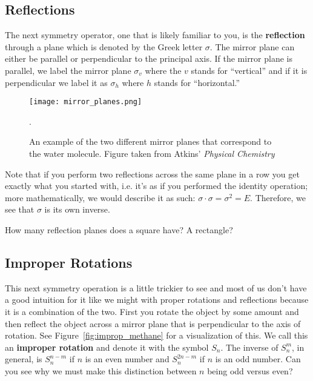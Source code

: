 
        \subsection*{Reflections} %
        \label{sub:reflection}

        The next symmetry operator, one that is likely familiar to you, is the \textbf{reflection} through a plane which is denoted by the Greek letter $\sigma.$ The mirror plane can either be parallel or perpendicular to the principal axis. If the mirror plane is parallel, we label the mirror plane $\sigma_v$ where the $v$ stands for ``vertical'' and if it is perpendicular we label it as $\sigma_h$ where $h$ stands for ``horizontal.''

        \begin{figure}[ht]
            \centering
            \texttt{[image: mirror\_planes.png]}
            \caption{An example of the two different mirror planes that correspond to the water molecule. Figure taken from Atkins' \emph{Physical Chemistry} \citep{atkins2014physical}}.
            \label{fig:mirros}
        \end{figure}

        Note that if you perform two reflections across the same plane in a row you get exactly what you started with, i.e. it's as if you performed the identity operation; more mathematically, we would describe it as such: $\sigma \cdot \sigma = \sigma^2 = E$. Therefore, we see that $\sigma$ is its own inverse.

        \begin{exercise}
            How many reflection planes does a square have? A rectangle?
        \end{exercise}

        \subsection*{Improper Rotations} %
        \label{sub:improp}

        This next symmetry operation is a little trickier to see and most of us don't have a good intuition for it like we might with proper rotations and reflections because it is a combination of the two. First you rotate the object by some amount and then reflect the object across a mirror plane that is perpendicular to the axis of rotation. See Figure~\ref{fig:improp_methane} for a visualization of this. We call this an \textbf{improper rotation} and denote it with the symbol $S_n$. The inverse of $S^m_n$, in general, is $S^{n-m}_n$ if $n$ is an even number and $S^{2n-m}_n$ if $n$ is an odd number. Can you see why we must make this distinction between $n$ being odd versus even?

